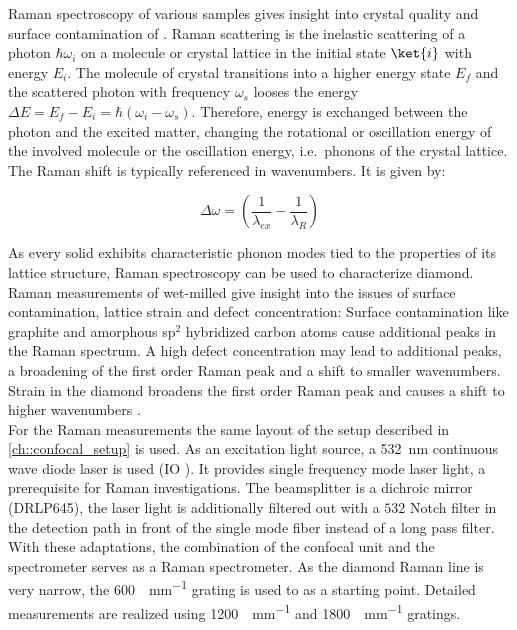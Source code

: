 			Raman spectroscopy of various samples gives insight into crystal quality and surface contamination of \nds.
			Raman scattering is the inelastic scattering of a photon $\hbar\omega_i$ on a molecule or crystal lattice in the initial state $\ket{i}$ with energy $E_i$.
			The molecule of crystal transitions into a higher energy state $E_f$ and the scattered photon with frequency $\omega_s$ looses the energy $\Delta E = E_f - E_i = \hbar(\omega_i-\omega_s)$.
			Therefore, energy is exchanged between the photon and the excited matter, changing the rotational or oscillation energy of the involved molecule or the oscillation energy, i.e.\ phonons of the crystal lattice.
			The Raman shift is typically referenced in wavenumbers.
			It is given by:

			\begin{equation}
				\Delta \omega = \left( \frac{1}{\lambda_{ex}}-\frac{1}{\lambda_R}\right)
			\end{equation}

			As every solid exhibits characteristic phonon modes tied to the properties of its lattice structure, Raman spectroscopy can be used to characterize diamond.
			Raman measurements of wet-milled \nds give insight into the issues of surface contamination, lattice strain and defect concentration:
			Surface contamination like graphite and amorphous sp$^2$ hybridized carbon atoms cause additional peaks in the Raman spectrum.
			A high defect concentration may lead to additional peaks, a broadening of the first order Raman peak and a shift to smaller wavenumbers.
			Strain in the diamond broadens the first order Raman peak and causes a shift to higher wavenumbers \cite{Zaitsev2001,Prawer2004,Orwa2000}.
			\\
			For the Raman measurements the same layout of the setup described in \autoref{ch::confocal_setup} is used.
			As an excitation light source, a \SI{532}{nm} continuous wave diode laser is used (IO ).
			It provides single frequency mode laser light, a prerequisite for Raman investigations.
			The beamsplitter is a dichroic mirror (DRLP645), the laser light is additionally filtered out with a $532$ Notch filter in the detection path in front of the single mode fiber instead of a long pass filter.
			With these adaptations, the combination of the confocal unit and the spectrometer serves as a Raman spectrometer.
			As the diamond Raman line is very narrow, the \SI[per-mode=symbol]{600}{\lines\per\mm} grating is used to as a starting point. Detailed measurements are realized using \SI[per-mode=symbol]{1200}{\lines\per\mm} and \SI[per-mode=symbol]{1800}{\lines\per\mm} gratings.
			\\

